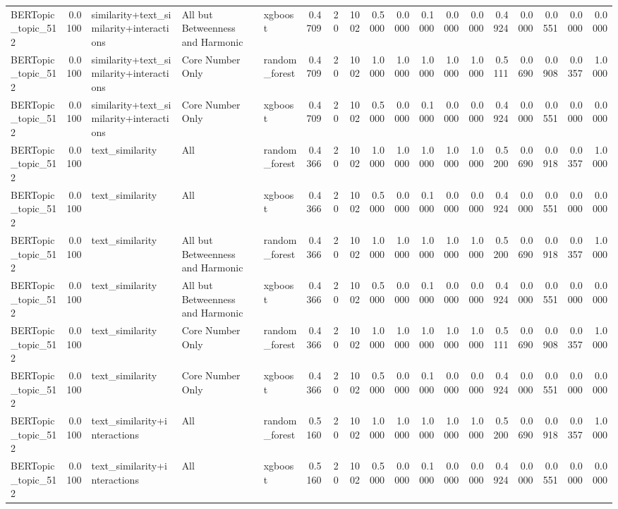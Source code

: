 \begin{tabular}{lrlllrrrrrrrrrrrrr}
BERTopic_topic_512 & 0.0100 & similarity+text_similarity+interactions & All but Betweenness and Harmonic & xgboost & 0.4709 & 20 & 1002 & 0.5000 & 0.0000 & 0.1000 & 0.0000 & 0.0000 & 0.4924 & 0.0000 & 0.0551 & 0.0000 & 0.0000 \\
BERTopic_topic_512 & 0.0100 & similarity+text_similarity+interactions & Core Number Only & random_forest & 0.4709 & 20 & 1002 & 1.0000 & 1.0000 & 1.0000 & 1.0000 & 1.0000 & 0.5111 & 0.0690 & 0.0908 & 0.0357 & 1.0000 \\
BERTopic_topic_512 & 0.0100 & similarity+text_similarity+interactions & Core Number Only & xgboost & 0.4709 & 20 & 1002 & 0.5000 & 0.0000 & 0.1000 & 0.0000 & 0.0000 & 0.4924 & 0.0000 & 0.0551 & 0.0000 & 0.0000 \\
BERTopic_topic_512 & 0.0100 & text_similarity & All & random_forest & 0.4366 & 20 & 1002 & 1.0000 & 1.0000 & 1.0000 & 1.0000 & 1.0000 & 0.5200 & 0.0690 & 0.0918 & 0.0357 & 1.0000 \\
BERTopic_topic_512 & 0.0100 & text_similarity & All & xgboost & 0.4366 & 20 & 1002 & 0.5000 & 0.0000 & 0.1000 & 0.0000 & 0.0000 & 0.4924 & 0.0000 & 0.0551 & 0.0000 & 0.0000 \\
BERTopic_topic_512 & 0.0100 & text_similarity & All but Betweenness and Harmonic & random_forest & 0.4366 & 20 & 1002 & 1.0000 & 1.0000 & 1.0000 & 1.0000 & 1.0000 & 0.5200 & 0.0690 & 0.0918 & 0.0357 & 1.0000 \\
BERTopic_topic_512 & 0.0100 & text_similarity & All but Betweenness and Harmonic & xgboost & 0.4366 & 20 & 1002 & 0.5000 & 0.0000 & 0.1000 & 0.0000 & 0.0000 & 0.4924 & 0.0000 & 0.0551 & 0.0000 & 0.0000 \\
BERTopic_topic_512 & 0.0100 & text_similarity & Core Number Only & random_forest & 0.4366 & 20 & 1002 & 1.0000 & 1.0000 & 1.0000 & 1.0000 & 1.0000 & 0.5111 & 0.0690 & 0.0908 & 0.0357 & 1.0000 \\
BERTopic_topic_512 & 0.0100 & text_similarity & Core Number Only & xgboost & 0.4366 & 20 & 1002 & 0.5000 & 0.0000 & 0.1000 & 0.0000 & 0.0000 & 0.4924 & 0.0000 & 0.0551 & 0.0000 & 0.0000 \\
BERTopic_topic_512 & 0.0100 & text_similarity+interactions & All & random_forest & 0.5160 & 20 & 1002 & 1.0000 & 1.0000 & 1.0000 & 1.0000 & 1.0000 & 0.5200 & 0.0690 & 0.0918 & 0.0357 & 1.0000 \\
BERTopic_topic_512 & 0.0100 & text_similarity+interactions & All & xgboost & 0.5160 & 20 & 1002 & 0.5000 & 0.0000 & 0.1000 & 0.0000 & 0.0000 & 0.4924 & 0.0000 & 0.0551 & 0.0000 & 0.0000 \\

\end{tabular}
